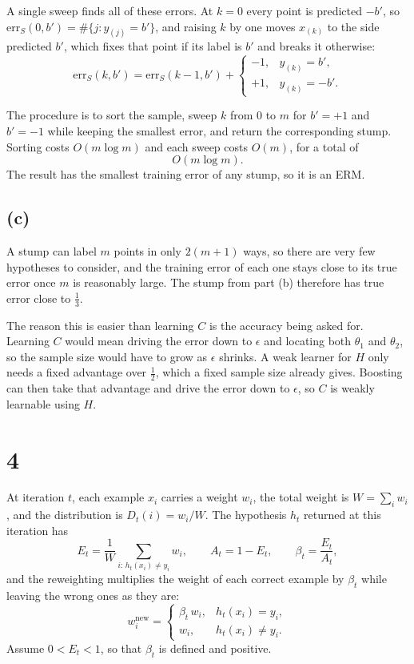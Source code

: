 \documentclass[11pt]{article}
\begin{document}
A single sweep finds all of these errors. At \(k=0\) every point is predicted
\(-b'\), so \(\mathrm{err}_S(0,b')=\#\{j:y_{(j)}=b'\}\), and raising \(k\) by
one moves \(x_{(k)}\) to the side predicted \(b'\), which fixes that point if
its label is \(b'\) and breaks it otherwise:
\[
\mathrm{err}_S(k,b')
=
\mathrm{err}_S(k-1,b')
+
\begin{cases}
-1, & y_{(k)}=b',\\
+1, & y_{(k)}=-b'.
\end{cases}
\]

The procedure is to sort the sample, sweep \(k\) from \(0\) to \(m\) for
\(b'=+1\) and \(b'=-1\) while keeping the smallest error, and return the
corresponding stump. Sorting costs \(O(m\log m)\) and each sweep costs
\(O(m)\), for a total of
\[
\boxed{
O(m\log m) .
}
\]
The result has the smallest training error of any stump, so it is an ERM.

\subsection*{(c)}

A stump can label \(m\) points in only \(2(m+1)\) ways, so there are very few
hypotheses to consider, and the training error of each one stays close to its
true error once \(m\) is reasonably large. The stump from part (b) therefore
has true error close to \(\frac13\).

The reason this is easier than learning \(C\) is the accuracy being asked
for. Learning \(C\) would mean driving the error down to \(\epsilon\) and
locating both \(\theta_1\) and \(\theta_2\), so the sample size would have to
grow as \(\epsilon\) shrinks. A weak learner for \(H\) only needs a fixed
advantage over \(\frac12\), which a fixed sample size already gives. Boosting
can then take that advantage and drive the error down to \(\epsilon\), so
\(C\) is weakly learnable using \(H\).

\section*{4}

At iteration \(t\), each example \(x_i\) carries a weight \(w_i\), the total
weight is \(W=\sum_i w_i\), and the distribution is \(D_t(i)=w_i/W\). The
hypothesis \(h_t\) returned at this iteration has
\[
E_t=\frac1W\sum_{i:\,h_t(x_i)\neq y_i}w_i,
\qquad
A_t=1-E_t,
\qquad
\beta_t=\frac{E_t}{A_t},
\]
and the reweighting multiplies the weight of each correct example by
\(\beta_t\) while leaving the wrong ones as they are:
\[
w_i^{\mathrm{new}}
=
\begin{cases}
\beta_t\,w_i, & h_t(x_i)=y_i,\\
w_i, & h_t(x_i)\neq y_i .
\end{cases}
\]
Assume \(0<E_t<1\), so that \(\beta_t\) is defined and positive.
\end{document}
